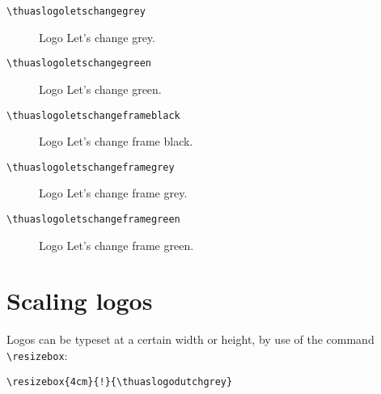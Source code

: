 \documentclass[a4paper,12pt]{article}
\begin{document}
\begin{verbatim}
\thuaslogoletschangegrey
\end{verbatim}

\begin{figure}[H]
\centering\fboxsep=0pt%
\fbox{%
\thuaslogoletschangegrey}
\caption{Logo Let's change grey.}
\end{figure}

\begin{verbatim}
\thuaslogoletschangegreen
\end{verbatim}

\begin{figure}[H]
\centering\fboxsep=0pt%
\fbox{%
\thuaslogoletschangegreen}
\caption{Logo Let's change green.}
\end{figure}

\begin{verbatim}
\thuaslogoletschangeframeblack
\end{verbatim}

\begin{figure}[H]
\centering\fboxsep=0pt%
\fbox{%
\thuaslogoletschangeframeblack}
\caption{Logo Let's change frame black.}
\end{figure}

\begin{verbatim}
\thuaslogoletschangeframegrey
\end{verbatim}

\begin{figure}[H]
\centering\fboxsep=0pt%
\fbox{%
\thuaslogoletschangeframegrey}
\caption{Logo Let's change frame grey.}
\end{figure}

\begin{verbatim}
\thuaslogoletschangeframegreen
\end{verbatim}

\begin{figure}[H]
\centering\fboxsep=0pt%
\fbox{%
\thuaslogoletschangeframegreen}
\caption{Logo Let's change frame green.}
\end{figure}


\section{Scaling logos}
Logos can be typeset at a certain width or height, by use of the command
\verb|\resizebox|:

\begin{verbatim}
\resizebox{4cm}{!}{\thuaslogodutchgrey}
\end{verbatim}
\end{document}
